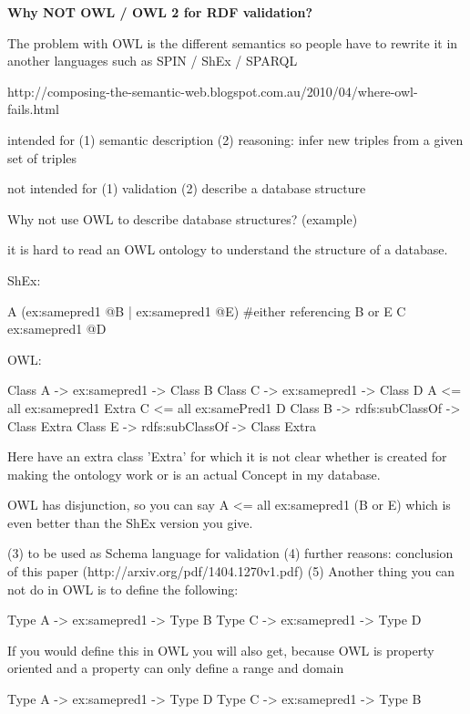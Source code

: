 \documentclass{llncs}
\begin{document}
\textbf{Why NOT OWL / OWL 2 for RDF validation?}

The problem with OWL is the different semantics so people have to rewrite it in another languages such as SPIN / ShEx / SPARQL

http://composing-the-semantic-web.blogspot.com.au/2010/04/where-owl-fails.html

intended for
(1) semantic description
(2) reasoning: infer new triples from a given set of triples

not intended for
(1) validation
(2) describe a database structure

Why not use OWL to describe database structures? (example)

it is hard to read an OWL ontology to understand the structure of a database.

ShEx:

\begin{ex}
A {
  (ex:samepred1 @B | ex:samepred1 @E) #either referencing B or E
}
C {
  ex:samepred1 @D
}
\end{ex}

OWL:

\begin{ex}
Class A -> ex:samepred1 -> Class B
Class C -> ex:samepred1 -> Class D
A <= all ex:samepred1 Extra
C <= all ex:samePred1 D
Class B -> rdfs:subClassOf -> Class Extra
Class E -> rdfs:subClassOf -> Class Extra
\end{ex}

Here have an extra class 'Extra' for which it is not clear whether is created for making the ontology work or is an actual Concept in my database.

OWL has disjunction, so you can say
A <= all ex:samepred1 (B or E)
which is even better than the ShEx version you give.

(3) to be used as Schema language for validation
(4) further reasons:  conclusion of this paper (http://arxiv.org/pdf/1404.1270v1.pdf)
(5) Another thing you can not do in OWL is to define the following:

\begin{ex}
Type A -> ex:samepred1 -> Type B
Type C -> ex:samepred1 -> Type D
\end{ex}

If you would define this in OWL you will also get, because OWL is property oriented and a property can only define a range and domain

\begin{ex}
Type A -> ex:samepred1 -> Type D
Type C -> ex:samepred1 -> Type B
\end{ex}
\end{document}
